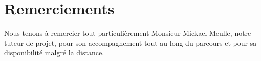 \section*{Remerciements}

Nous tenons \`a remercier tout particuli\`erement Monsieur Mickael Meulle, notre tuteur de projet, pour son accompagnement tout au long du parcours et pour sa disponibilit\'e malgr\'e la distance.
